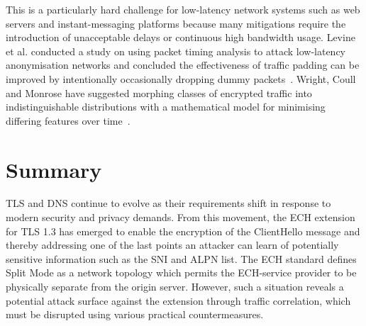 This is a particularly hard challenge for low-latency network systems such as web servers and instant-messaging platforms because many mitigations require the introduction of unacceptable delays or continuous high bandwidth usage. Levine et al. conducted a study on using packet timing analysis to attack low-latency anonymisation networks and concluded the effectiveness of traffic padding can be improved by intentionally occasionally dropping dummy packets~\cite{levine2004timing}. Wright, Coull and Monrose have suggested morphing classes of encrypted traffic into indistinguishable distributions with a mathematical model for minimising differing features over time~\cite{wright2009traffic}.









\section{Summary}

TLS and DNS continue to evolve as their requirements shift in response to modern security and privacy demands. From this movement, the ECH extension for TLS 1.3 has emerged to enable the encryption of the ClientHello message and thereby addressing one of the last points an attacker can learn of potentially sensitive information such as the SNI and ALPN list. The ECH standard defines Split Mode as a network topology which permits the ECH-service provider to be physically separate from the origin server. However, such a situation reveals a potential attack surface against the extension through traffic correlation, which must be disrupted using various practical countermeasures.
